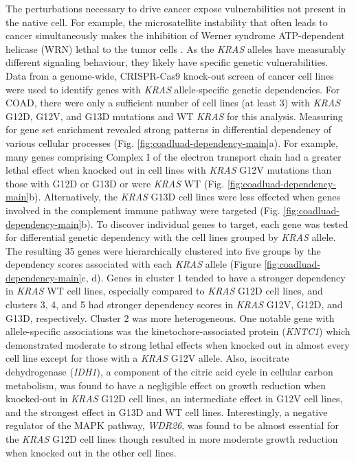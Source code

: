 \documentclass[english, 12pt, letterpaper]{article}
\newcommand{\KRAS}{\emph{KRAS}}
\begin{document}
The perturbations necessary to drive cancer expose vulnerabilities not present in the native cell.
For example, the microsatellite instability that often leads to cancer simultaneously makes the inhibition of Werner syndrome ATP-dependent helicase (WRN) lethal to the tumor cells \cite{Behan2019, Chan2019}.
As the \KRAS{} alleles have measurably different signaling behaviour, they likely have specific genetic vulnerabilities.
Data from a genome-wide, CRISPR-Cas9 knock-out screen of cancer cell lines \cite{Tsherniak2017, Meyers2017} were used to identify genes with \KRAS{} allele-specific genetic dependencies.
For COAD, there were only a sufficient number of cell lines (at least 3) with \KRAS{} G12D, G12V, and G13D mutations and WT \KRAS{} for this analysis.
Measuring for gene set enrichment revealed strong patterns in differential dependency of various cellular processes (Fig. \ref{fig:coadluad-dependency-main}a).
For example, many genes comprising Complex I of the electron transport chain had a greater lethal effect when knocked out in cell lines with \KRAS{} G12V mutations than those with G12D or G13D or were \KRAS{} WT (Fig. \ref{fig:coadluad-dependency-main}b).
Alternatively, the \KRAS{} G13D cell lines were less effected when genes involved in the complement immune pathway were targeted (Fig. \ref{fig:coadluad-dependency-main}b).
To discover individual genes to target, each gene was tested for differential genetic dependency with the cell lines grouped by \KRAS{} allele. 
The resulting 35 genes were hierarchically clustered into five groups by the dependency scores associated with each \KRAS{} allele (Figure \ref{fig:coadluad-dependency-main}c, d).
Genes in cluster 1 tended to have a stronger dependency in \KRAS{} WT cell lines, especially compared to \KRAS{} G12D cell lines, and clusters 3, 4, and 5 had stronger dependency scores in \KRAS{} G12V, G12D, and G13D, respectively. Cluster 2 was more heterogeneous.
One notable gene with allele-specific associations was the kinetochore-associated protein (\emph{KNTC1}) which demonstrated moderate to strong lethal effects when knocked out in almost every cell line except for those with a \KRAS{} G12V allele.
Also, isocitrate dehydrogenase (\emph{IDH1}), a component of the citric acid cycle in cellular carbon metabolism, was found to have a negligible effect on growth reduction when knocked-out in \KRAS{} G12D cell lines, an intermediate effect in G12V cell lines, and the strongest effect in G13D and WT cell lines.
Interestingly, a negative regulator of the MAPK pathway, \emph{WDR26}, was found to be almost essential for the \KRAS{} G12D cell lines though resulted in more moderate growth reduction when knocked out in the other cell lines.
\end{document}
